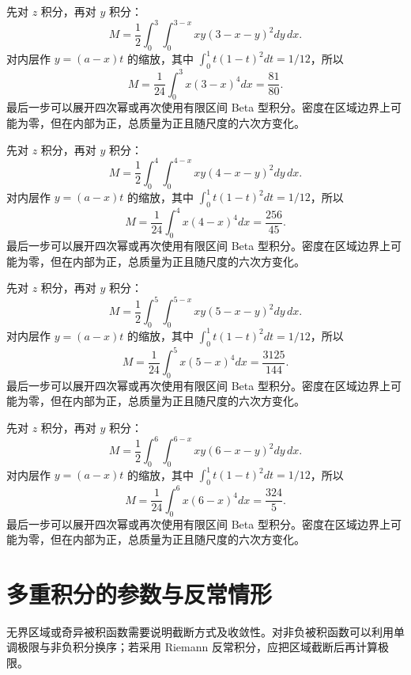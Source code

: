 \documentclass[12pt,fontset=fandol]{ctexart}
\begin{document}
\begin{solve}\label{ans:c39q21}
先对 $z$ 积分，再对 $y$ 积分：
\[
M=\frac12\int_0^{3}\int_0^{3-x}xy(3-x-y)^2dy\,dx.
\]
对内层作 $y=(a-x)t$ 的缩放，其中 $\int_0^1t(1-t)^2dt=1/12$，所以
\[
M=\frac1{24}\int_0^{3}x(3-x)^4dx=\frac{81}{80}.
\]
最后一步可以展开四次幂或再次使用有限区间 Beta 型积分。密度在区域边界上可能为零，但在内部为正，总质量为正且随尺度的六次方变化。
\end{solve}

\begin{solve}\label{ans:c39q22}
先对 $z$ 积分，再对 $y$ 积分：
\[
M=\frac12\int_0^{4}\int_0^{4-x}xy(4-x-y)^2dy\,dx.
\]
对内层作 $y=(a-x)t$ 的缩放，其中 $\int_0^1t(1-t)^2dt=1/12$，所以
\[
M=\frac1{24}\int_0^{4}x(4-x)^4dx=\frac{256}{45}.
\]
最后一步可以展开四次幂或再次使用有限区间 Beta 型积分。密度在区域边界上可能为零，但在内部为正，总质量为正且随尺度的六次方变化。
\end{solve}

\begin{solve}\label{ans:c39q23}
先对 $z$ 积分，再对 $y$ 积分：
\[
M=\frac12\int_0^{5}\int_0^{5-x}xy(5-x-y)^2dy\,dx.
\]
对内层作 $y=(a-x)t$ 的缩放，其中 $\int_0^1t(1-t)^2dt=1/12$，所以
\[
M=\frac1{24}\int_0^{5}x(5-x)^4dx=\frac{3125}{144}.
\]
最后一步可以展开四次幂或再次使用有限区间 Beta 型积分。密度在区域边界上可能为零，但在内部为正，总质量为正且随尺度的六次方变化。
\end{solve}

\begin{solve}\label{ans:c39q24}
先对 $z$ 积分，再对 $y$ 积分：
\[
M=\frac12\int_0^{6}\int_0^{6-x}xy(6-x-y)^2dy\,dx.
\]
对内层作 $y=(a-x)t$ 的缩放，其中 $\int_0^1t(1-t)^2dt=1/12$，所以
\[
M=\frac1{24}\int_0^{6}x(6-x)^4dx=\frac{324}{5}.
\]
最后一步可以展开四次幂或再次使用有限区间 Beta 型积分。密度在区域边界上可能为零，但在内部为正，总质量为正且随尺度的六次方变化。
\end{solve}

\clearpage
\section{多重积分的参数与反常情形}\label{sec:ch40}
无界区域或奇异被积函数需要说明截断方式及收敛性。对非负被积函数可以利用单调极限与非负积分换序；若采用 Riemann 反常积分，应把区域截断后再计算极限。
\end{document}
